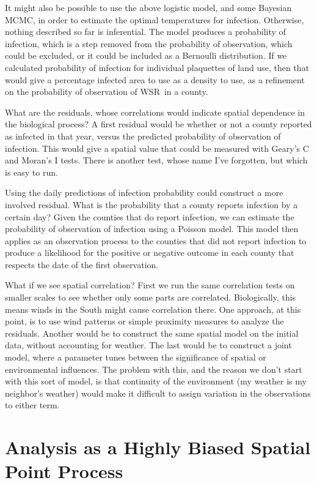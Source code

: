 \documentclass{article}
\newcommand{\wsr}{\textsc{WSR}}
\begin{document}
It might also be possible to use the above logistic model, and some Bayesian MCMC, in order to estimate the optimal temperatures for infection. Otherwise, nothing described so far is
inferential. The model produces a probability of infection, which is a step removed from 
the probability of observation, which could be excluded, or it could be included as a 
Bernoulli distribution. If we calculated probability of infection for individual plaquettes
of land use, then that would give a percentage infected area to use as a density to use, as 
a refinement on the probability of observation of \wsr\ in a county.

What are the residuals, whose correlations would indicate spatial dependence in the
biological process? A first residual would be whether or not a county reported as infected
in that year, versus the predicted probability of observation of infection. This would
give a spatial value that could be measured with Geary's C and Moran's I tests. There is
another test, whose name I've forgotten, but which is easy to run.

Using the daily predictions of infection probability could construct a more involved residual.
What is the probability that a county reports infection by a certain day? Given the counties
that do report infection, we can estimate the probability of observation of infection using
a Poisson model. This model then applies as an observation process to the counties that did not report infection to produce a likelihood for the positive or negative outcome in each county
that respects the date of the first observation.

What if we see spatial correlation? First we run the same correlation tests on smaller scales to see whether only some parts are correlated. Biologically, this means winds in the South might
cause correlation there. One approach, at this point, is to use wind patterns or simple proximity
measures to analyze the residuals. Another would be to construct the same spatial model on
the initial data, without accounting for weather. The last would be to construct a joint model,
where a parameter tunes between the significance of spatial or environmental influences. The
problem with this, and the reason we don't start with this sort of model, is that continuity
of the environment (my weather is my neighbor's weather) would make it difficult to 
assign variation in the observations to either term.


\section{Analysis as a Highly Biased Spatial Point Process}
\end{document}
